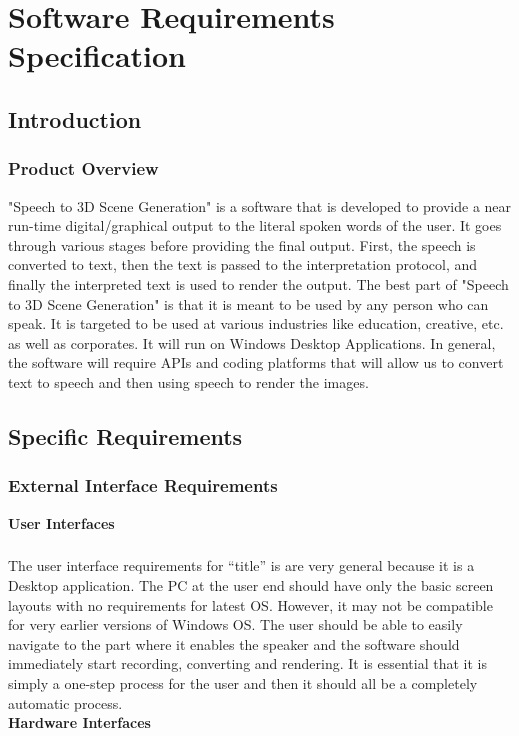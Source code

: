 \chapter{Software Requirements Specification}
\section{Introduction}
\subsection{Product Overview}
"Speech to 3D Scene Generation" is a software that is developed to provide a near run-time digital/graphical output to the literal spoken words of the user. It goes through various stages before providing the final output. First, the speech is converted to text, then the text is passed to the interpretation protocol, and finally the interpreted text is used to render the output.\linebreak
	The best part of "Speech to 3D Scene Generation" is that it is meant to be used by any person who can speak. It is targeted to be used at various industries like education, creative, etc. as well as corporates. It will run on Windows Desktop Applications. \linebreak
	In general, the software will require APIs and coding platforms that will allow us to convert text to speech and then using speech to render the images.
\section{Specific Requirements}
\subsection{External Interface Requirements}
\textbf{User Interfaces}
\paragraph{} The user interface requirements for “title” is are very general because it is a Desktop application. The PC at the user end should have only the basic screen layouts with no requirements for latest OS. However, it may not be compatible for very earlier versions of Windows OS.\linebreak
	The user should be able to easily navigate to the part where it enables the speaker and the software should immediately start recording, converting and rendering. It is essential that it is simply a one-step process for the user and then it should all be a completely automatic process.\\
	\newline
\textbf{Hardware Interfaces}
